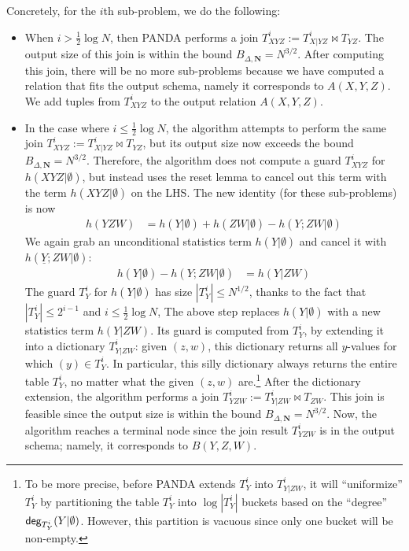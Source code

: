 \documentclass{theoretics}
\newcommand{\degree}{\text{\sf deg}}
\newcommand{\panda}{\textsf{PANDA}\xspace}
\begin{document}
Concretely, for the $i$th sub-problem, we do the following:
%
\begin{itemize}
\item When $i > \frac 1 2 \log N$, then \panda performs a join
  $T^i_{XYZ} := T^i_{X|YZ} \Join T_{YZ}$.
  The output size of this join is within the bound $B_{\Delta, \bm N} =
  N^{3/2}$. After computing this join, there will be no more sub-problems because
  we have computed a relation that fits the output schema,
  namely it corresponds to $A(X, Y, Z)$.
  We add tuples from $T^i_{XYZ}$ to the output relation $A(X,Y,Z)$.

\item In the case where $i \leq \frac 1 2 \log N$, the algorithm attempts to
  perform the same join $T^i_{XYZ} := T^i_{X|YZ} \Join T_{YZ}$, but its
  output size now exceeds the bound $B_{\Delta, \bm N} = N^{3/2}$.  Therefore, the
  algorithm does not compute a guard $T^i_{XYZ}$ for $h(XYZ|\emptyset)$, but
  instead uses the reset lemma to cancel out this term with the term
  $h(XYZ|\emptyset)$ on the LHS.
  The new identity (for these sub-problems) is now
    \begin{align*}
      h(YZW) &= h(Y|\emptyset) + h(ZW|\emptyset)- h(Y;ZW|\emptyset)
    \end{align*}
  We again grab an unconditional statistics term $h(Y|\emptyset)$
  and cancel it with $h(\underline{Y};ZW|\emptyset)$:
    \begin{align*}
      h(Y|\emptyset)-h(Y;ZW|\emptyset) &= h(Y|ZW)
    \end{align*}
    The guard $T^i_Y$ for $h(Y|\emptyset)$ has size $|T^i_Y| \leq N^{1/2}$,
    thanks to the fact that $|T^i_Y| \leq 2^{i-1}$ and $i \leq \frac{1}{2}\log N$,
  The above step replaces $h(Y|\emptyset)$ with a new statistics term $h(Y|ZW)$.  Its guard is computed from $T^i_Y$, by extending it
  into a dictionary $T^i_{Y|ZW}$: given $(z,w)$, this dictionary returns all $y$-values for which $(y) \in T^i_Y$.
  In particular, this silly dictionary always returns the entire table $T^i_Y$, no matter what the given $(z, w)$ are.\footnote{
    To be more precise, before \panda extends $T^i_Y$ into $T^i_{Y|ZW}$, it will ``uniformize'' $T^i_Y$ by partitioning the table $T^i_Y$ into $\log |T^i_Y|$
  buckets based on the ``degree'' $\degree_{T^i_Y}(Y|\emptyset)$.
  However, this partition is vacuous since only one bucket will be non-empty.}
  After the dictionary extension, the algorithm performs a join
  $T^{i}_{YZW}:=T^i_{Y|ZW}\Join T_{ZW}$.
  This join is feasible since the output size is
  within the bound $B_{\Delta, \bm N} = N^{3/2}$.  Now, the algorithm reaches a
  terminal node since the join result $T^{i}_{YZW}$ is in the output
  schema; namely, it corresponds to $B(Y, Z, W)$.
\end{itemize}
\end{document}
